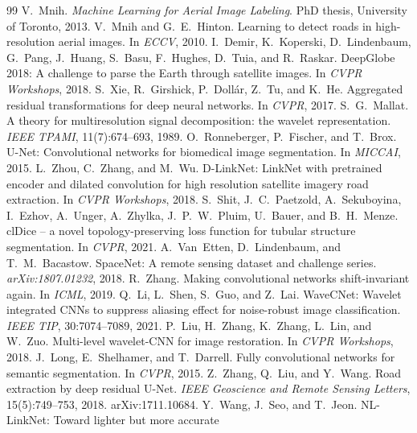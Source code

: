 \documentclass[11pt]{article}
\begin{document}
\begin{thebibliography}{99}
 V.~Mnih. \emph{Machine Learning for Aerial Image Labeling}. PhD thesis,
  University of Toronto, 2013.
 V.~Mnih and G.~E.~Hinton. Learning to detect roads in high-resolution aerial
  images. In \emph{ECCV}, 2010.
 I.~Demir, K.~Koperski, D.~Lindenbaum, G.~Pang, J.~Huang, S.~Basu, F.~Hughes,
  D.~Tuia, and R.~Raskar. DeepGlobe 2018: A challenge to parse the Earth through satellite images.
  In \emph{CVPR Workshops}, 2018.
 S.~Xie, R.~Girshick, P.~Doll\'ar, Z.~Tu, and K.~He. Aggregated residual
  transformations for deep neural networks. In \emph{CVPR}, 2017.
 S.~G.~Mallat. A theory for multiresolution signal decomposition: the wavelet
  representation. \emph{IEEE TPAMI}, 11(7):674--693, 1989.
 O.~Ronneberger, P.~Fischer, and T.~Brox. U-Net: Convolutional networks
  for biomedical image segmentation. In \emph{MICCAI}, 2015.
 L.~Zhou, C.~Zhang, and M.~Wu. D-LinkNet: LinkNet with pretrained encoder and
  dilated convolution for high resolution satellite imagery road extraction. In
  \emph{CVPR Workshops}, 2018.
 S.~Shit, J.~C.~Paetzold, A.~Sekuboyina, I.~Ezhov, A.~Unger, A.~Zhylka,
  J.~P.~W.~Pluim, U.~Bauer, and B.~H.~Menze. clDice -- a novel topology-preserving loss function
  for tubular structure segmentation. In \emph{CVPR}, 2021.
 A.~Van~Etten, D.~Lindenbaum, and T.~M.~Bacastow. SpaceNet: A remote sensing
  dataset and challenge series. \emph{arXiv:1807.01232}, 2018.
 R.~Zhang. Making convolutional networks shift-invariant again. In
  \emph{ICML}, 2019.
 Q.~Li, L.~Shen, S.~Guo, and Z.~Lai. WaveCNet: Wavelet integrated CNNs to
  suppress aliasing effect for noise-robust image classification. \emph{IEEE TIP}, 30:7074--7089, 2021.
 P.~Liu, H.~Zhang, K.~Zhang, L.~Lin, and W.~Zuo. Multi-level wavelet-CNN for
  image restoration. In \emph{CVPR Workshops}, 2018.
 J.~Long, E.~Shelhamer, and T.~Darrell. Fully convolutional networks for
  semantic segmentation. In \emph{CVPR}, 2015.
 Z.~Zhang, Q.~Liu, and Y.~Wang. Road extraction by deep residual U-Net.
  \emph{IEEE Geoscience and Remote Sensing Letters}, 15(5):749--753, 2018. arXiv:1711.10684.
 Y.~Wang, J.~Seo, and T.~Jeon. NL-LinkNet: Toward lighter but more accurate

\end{thebibliography}
\end{document}
